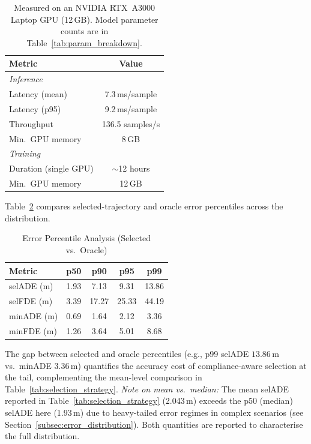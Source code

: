 \begin{table}[t]
\centering
\caption{Hardware Requirements and Efficiency Summary}
\label{tab:efficiency}
\begin{tabular}{lc}
\toprule
\textbf{Metric} & \textbf{Value} \\
\midrule
\multicolumn{2}{l}{\textit{Inference}} \\
Latency (mean) & 7.3\,ms/sample \\
Latency (p95) & 9.2\,ms/sample \\
Throughput & 136.5 samples/s \\
Min.\ GPU memory & 8\,GB \\
\midrule
\multicolumn{2}{l}{\textit{Training}} \\
Duration (single GPU) & ${\sim}$12 hours \\
Min.\ GPU memory & 12\,GB \\
\bottomrule
\end{tabular}
\vspace{1mm}
\caption*{\footnotesize Measured on an NVIDIA RTX~A3000 Laptop GPU
(12\,GB).  Model parameter counts are in Table~\ref{tab:param_breakdown}.}
\end{table}

Table~\ref{tab:error_percentiles} compares
selected-trajectory and oracle error percentiles across the distribution.

\begin{table}[t]
\centering
\caption{Error Percentile Analysis (Selected vs.\ Oracle)}
\label{tab:error_percentiles}
\begin{tabular}{lcccc}
\toprule
\textbf{Metric} & \textbf{p50} & \textbf{p90} & \textbf{p95} & \textbf{p99} \\
\midrule
selADE (m) & 1.93 & 7.13 & 9.31 & 13.86 \\
selFDE (m) & 3.39 & 17.27 & 25.33 & 44.19 \\
minADE (m) & 0.69 & 1.64 & 2.12 & 3.36 \\
minFDE (m) & 1.26 & 3.64 & 5.01 & 8.68 \\
\bottomrule
\end{tabular}
\end{table}

\noindent
The gap between selected and oracle percentiles (e.g., p99 selADE $13.86\,\text{m}$ vs.\ minADE $3.36\,\text{m}$) quantifies the accuracy cost of compliance-aware selection at the tail, complementing the mean-level comparison in Table~\ref{tab:selection_strategy}. \textit{Note on mean vs.\ median:} The mean selADE reported in Table~\ref{tab:selection_strategy} (2.043\,m) exceeds the p50 (median) selADE here (1.93\,m) due to heavy-tailed error regimes in complex scenarios (see Section~\ref{subsec:error_distribution}).  Both quantities are reported to characterise the full distribution.


